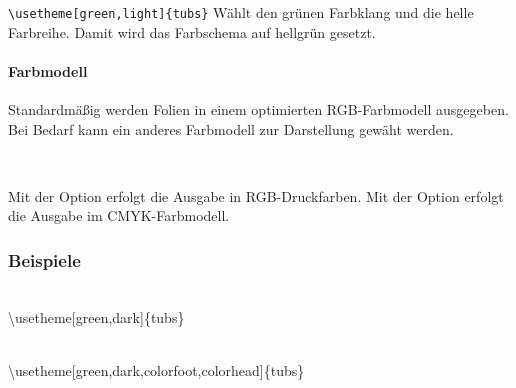 \begin{example}
\lstinline!\usetheme[green,light]{tubs}! Wählt den grünen Farbklang und die
helle Farbreihe. Damit wird das Farbschema auf hellgrün gesetzt.
\end{example}

\paragraph{Farbmodell}
Standardmäßig werden Folien in einem optimierten RGB-Farbmodell ausgegeben.
Bei Bedarf kann ein anderes Farbmodell zur Darstellung gewäht werden.


\begin{Declaration}
  \\
\end{Declaration}

Mit der Option  erfolgt die Ausgabe in RGB-Druckfarben.
Mit der Option  erfolgt die Ausgabe im CMYK-Farbmodell.

\clearpage
\subsubsection{Beispiele}

\begin{center}
\begin{minipage}{0.49\textwidth}
\end{minipage}\hfill
\begin{minipage}{0.49\textwidth}
\end{minipage}\medskip\\
{\ttfamily \textbackslash usetheme[green,dark]\{tubs\}}
\end{center}

\begin{center}
\begin{minipage}{0.49\textwidth}
\end{minipage}
\begin{minipage}{0.49\textwidth}
\end{minipage}\medskip\\
{\ttfamily \textbackslash usetheme[green,dark,colorfoot,colorhead]\{tubs\}}
\end{center}


